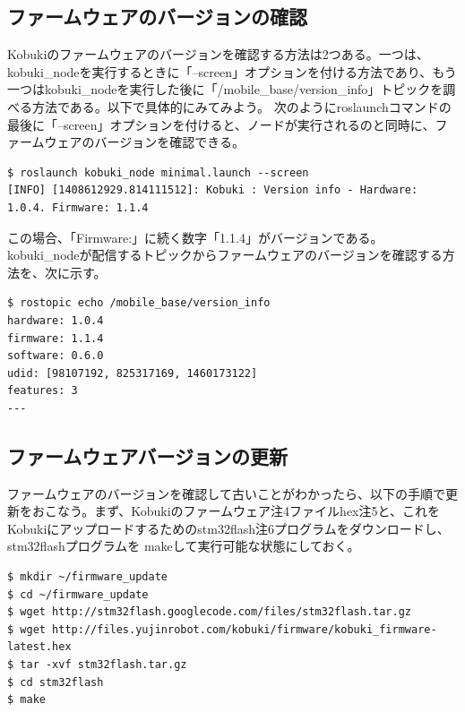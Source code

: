 \begin{itemize}
\subsection{ファームウェアのバージョンの確認}

Kobukiのファームウェアのバージョンを確認する方法は2つある。一つは、kobuki\_nodeを実行するときに「--screen」オプションを付ける方法であり、もう一つはkobuki\_nodeを実行した後に「/mobile\_base/version\_info」トピックを調べる方法である。以下で具体的にみてみよう。
次のようにroslaunchコマンドの最後に「--screen」オプションを付けると、ノードが実行されるのと同時に、ファームウェアのバージョンを確認できる。

\begin{lstlisting}[language=ROS]
$ roslaunch kobuki_node minimal.launch --screen
[INFO] [1408612929.814111512]: Kobuki : Version info - Hardware: 1.0.4. Firmware: 1.1.4
\end{lstlisting}

この場合、「Firmware:」に続く数字「1.1.4」がバージョンである。
kobuki\_nodeが配信するトピックからファームウェアのバージョンを確認する方法を、次に示す。

\begin{lstlisting}[language=ROS]
$ rostopic echo /mobile_base/version_info
hardware: 1.0.4
firmware: 1.1.4
software: 0.6.0
udid: [98107192, 825317169, 1460173122]
features: 3
---
\end{lstlisting}

\subsection{ファームウェアバージョンの更新}

ファームウェアのバージョンを確認して古いことがわかったら、以下の手順で更新をおこなう。まず、Kobukiのファームウェア注4ファイルhex注5と、これをKobukiにアップロードするためのstm32flash注6プログラムをダウンロードし、stm32flashプログラムを makeして実行可能な状態にしておく。

\begin{lstlisting}[language=ROS]
$ mkdir ~/firmware_update
$ cd ~/firmware_update
$ wget http://stm32flash.googlecode.com/files/stm32flash.tar.gz
$ wget http://files.yujinrobot.com/kobuki/firmware/kobuki_firmware-latest.hex
$ tar -xvf stm32flash.tar.gz
$ cd stm32flash
$ make
\end{lstlisting}


\end{itemize}
